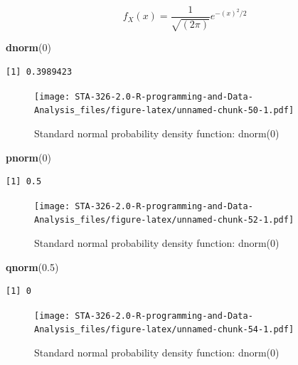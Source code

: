 \documentclass[]{book}
\newenvironment{Shaded}{\begin{snugshade}}{\end{snugshade}}
\newcommand{\DecValTok}[1]{\textcolor[rgb]{0.00,0.00,0.81}{#1}}
\newcommand{\FloatTok}[1]{\textcolor[rgb]{0.00,0.00,0.81}{#1}}
\newcommand{\KeywordTok}[1]{\textcolor[rgb]{0.13,0.29,0.53}{\textbf{#1}}}
\newcommand{\NormalTok}[1]{#1}
\begin{document}
\[
f_X(x) = \frac{1}{\sqrt{(2\pi)}} e^{-(x)^2/2}
\]

\begin{Shaded}
\begin{Highlighting}[]
\KeywordTok{dnorm}\NormalTok{(}\DecValTok{0}\NormalTok{)}
\end{Highlighting}
\end{Shaded}

\begin{verbatim}
[1] 0.3989423
\end{verbatim}

\begin{figure}
\centering
\texttt{[image: STA-326-2.0-R-programming-and-Data-Analysis\_files/figure-latex/unnamed-chunk-50-1.pdf]}
\caption{\label{fig:unnamed-chunk-50}Standard normal probability density function: dnorm(0)}
\end{figure}

\begin{Shaded}
\begin{Highlighting}[]
\KeywordTok{pnorm}\NormalTok{(}\DecValTok{0}\NormalTok{)}
\end{Highlighting}
\end{Shaded}

\begin{verbatim}
[1] 0.5
\end{verbatim}

\begin{figure}
\centering
\texttt{[image: STA-326-2.0-R-programming-and-Data-Analysis\_files/figure-latex/unnamed-chunk-52-1.pdf]}
\caption{\label{fig:unnamed-chunk-52}Standard normal probability density function: dnorm(0)}
\end{figure}

\begin{Shaded}
\begin{Highlighting}[]
\KeywordTok{qnorm}\NormalTok{(}\FloatTok{0.5}\NormalTok{)}
\end{Highlighting}
\end{Shaded}

\begin{verbatim}
[1] 0
\end{verbatim}

\begin{figure}
\centering
\texttt{[image: STA-326-2.0-R-programming-and-Data-Analysis\_files/figure-latex/unnamed-chunk-54-1.pdf]}
\caption{\label{fig:unnamed-chunk-54}Standard normal probability density function: dnorm(0)}
\end{figure}
\end{document}
